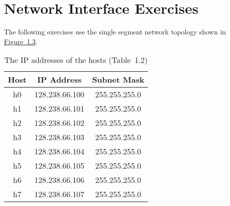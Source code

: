 \documentclass{../UTNetLab}
\begin{document}
\part{Network Interface Exercises}
The following exercises use the single segment network topology shown in \hyperref[fig:1.3]{Figure~1.3}.
\begin{center}
    \begin{minipage}{0.48\textwidth}
        \begin{flushleft}
            \begin{table}[H]
                \caption{The IP addresses of the hosts (Table~1.2)}
                \centering
                \begin{tabular}{ c c c }
                    \hline \hline
                    Host & IP Address     & Subnet Mask   \\
                    \hline
                    h0   & 128.238.66.100 & 255.255.255.0 \\
                    h1   & 128.238.66.101 & 255.255.255.0 \\
                    h2   & 128.238.66.102 & 255.255.255.0 \\
                    h3   & 128.238.66.103 & 255.255.255.0 \\
                    h4   & 128.238.66.104 & 255.255.255.0 \\
                    h5   & 128.238.66.105 & 255.255.255.0 \\
                    h6   & 128.238.66.106 & 255.255.255.0 \\
                    h7   & 128.238.66.107 & 255.255.255.0 \\
                    \hline \hline
                \end{tabular}
            \end{table}
        \end{flushleft}
    \end{minipage}
    \begin{minipage}{0.48\textwidth}
        \begin{flushright}
            \begin{figure}[H]
                \centering
\end{figure}
\end{flushright}
\end{minipage}
\end{center}
\end{document}
